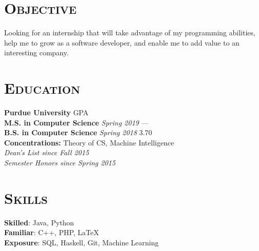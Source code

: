 
\hypersetup{backref,pdfpagemode=Full,colorlinks=true,backref}

\addtolength{\oddsidemargin}{-0.45in}
\addtolength{\voffset}{-0.20in}
\addtolength{\textwidth}{0.85in} 
\addtolength{\textheight}{1.00in}

\renewcommand{\namefont}{\LARGE\emph}




\address{ryndvs96@gmail.com \ \ \ \ \ github.com/ryndvs96}
\begin{resume}


  \section{\textsc{Objective}}

  Looking for an internship that will take advantage of my programming abilities, help me to grow as a software developer, and enable me to add value to an interesting company.


  \section{\textsc{Education}}

  \textbf{Purdue University} \hfill GPA \\
  \textbf{M.S. in Computer Science} \emph{Spring 2019} \hfill ---\\
  \textbf{B.S. in Computer Science} \emph{Spring 2018} \hfill 3.70\\
  \textbf{Concentrations:} Theory of CS, Machine Intelligence\\
  \emph{Dean's List since Fall 2015}\\
  \emph{Semester Honors since Spring 2015}

  \section{\textsc{Skills}}

  \small{\textbf{Skilled}: }\normalsize{Java, Python}\\
  \small{\textbf{Familiar}: }\normalsize{C++, PHP, \LaTeX}\\
  \small{\textbf{Exposure}: }\normalsize{SQL, Haskell, Git, Machine Learning}


\end{resume}
